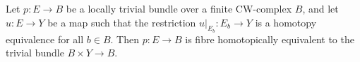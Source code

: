 Let $p: E \rightarrow B$ be a locally trivial bundle over a finite CW-complex $B$, and let $u: E \rightarrow Y$ be a map such that the restriction $u|_{E_b}: E_b \rightarrow Y$ is a homotopy equivalence for all $b \in B$. Then $p: E \rightarrow B$ is fibre homotopically equivalent to the trivial bundle $B \times Y \rightarrow B$.
